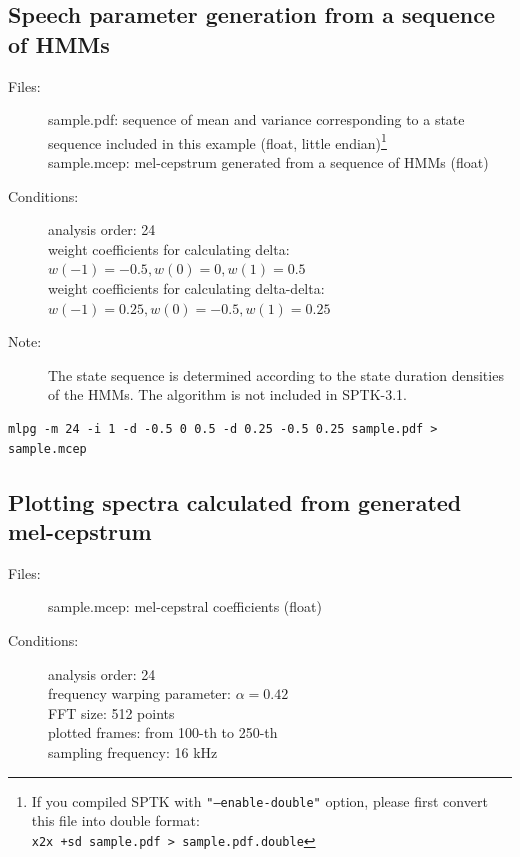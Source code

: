 \documentclass[a4paper,10pt]{article}
\begin{document}
\subsection{Speech parameter generation from a sequence of HMMs}

\begin{description}
\item[Files:]
  sample.pdf: sequence of mean and variance
              corresponding to a state sequence included in this example (float, little endian)\footnote{If you compiled SPTK with
\texttt{"--enable-double"} option, please first convert this file into double
format:\\ \texttt{x2x +sd sample.pdf > sample.pdf.double}}\\
  sample.mcep: mel-cepstrum generated from a sequence of HMMs (float)
\item[Conditions:]
  analysis order: 24\\
  weight coefficients for calculating delta: $w(-1)=-0.5,w(0)=0,w(1)=0.5$\\
  weight coefficients for calculating delta-delta: $w(-1)=0.25,w(0)=-0.5,w(1)=0.25$
\item[Note:]
  The state sequence is determined according to the state
  duration densities of the HMMs.  The algorithm is not included
  in SPTK-3.1.
\end{description}

\begin{verbatim}
mlpg -m 24 -i 1 -d -0.5 0 0.5 -d 0.25 -0.5 0.25 sample.pdf > sample.mcep
\end{verbatim}

\subsection{Plotting spectra calculated from generated mel-cepstrum}

\begin{description}
\item[Files:]
  sample.mcep: mel-cepstral coefficients (float)
\item[Conditions:]
  analysis order: 24\\
  frequency warping parameter: $\alpha = 0.42$\\
  FFT size: 512 points\\
  plotted frames: from 100-th to 250-th\\
  sampling frequency: 16 kHz
\end{description}
\end{document}
